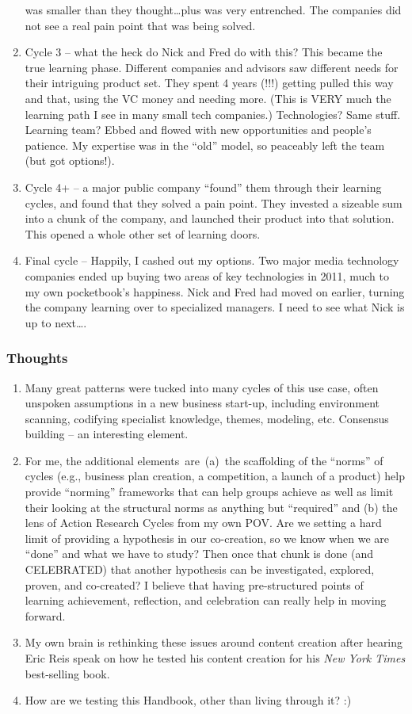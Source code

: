 \begin{enumerate}
  was smaller than they thought\ldots{}plus was very entrenched. The
  companies did not see a real pain point that was being solved.
\item
  Cycle 3 -- what the heck do Nick and Fred do with this? This became
  the true learning phase. Different companies and advisors saw
  different needs for their intriguing product set. They spent 4 years
  (!!!) getting pulled this way and that, using the VC money and needing
  more. (This is VERY much the learning path I see in many small tech
  companies.) Technologies? Same stuff. Learning team? Ebbed and flowed
  with new opportunities and people's patience. My expertise was in the
  ``old'' model, so peaceably left the team (but got options!).
\item
  Cycle 4+ -- a major public company ``found'' them through their
  learning cycles, and found that they solved a pain point. They
  invested a sizeable sum into a chunk of the company, and launched
  their product into that solution. This opened a whole other set of
  learning doors.
\item
  Final cycle -- Happily, I cashed out my options. Two major media
  technology companies ended up buying two areas of key technologies in
  2011, much to my own pocketbook's happiness. Nick and Fred had moved
  on earlier, turning the company learning over to specialized managers.
  I need to see what Nick is up to next\ldots{}.
\end{enumerate}

\subsubsection{Thoughts}

\begin{enumerate}
\item
  Many great patterns were tucked into many cycles of this use case,
  often unspoken assumptions in a new business start-up, including
  environment scanning, codifying specialist knowledge, themes,
  modeling, etc. Consensus building -- an interesting element.
\item
  For me, the additional elements~are~(a)~the scaffolding of the
  ``norms'' of cycles (e.g., business plan creation, a competition, a
  launch of a product) help provide ``norming'' frameworks that can help
  groups achieve as well as limit their looking at the structural norms
  as anything but ``required'' and (b) the lens of Action Research
  Cycles from my own POV. Are we setting a hard limit of providing a
  hypothesis in our co-creation, so we know when we are ``done'' and
  what we have to study? Then once that chunk is done (and CELEBRATED)
  that another hypothesis can be investigated, explored, proven, and
  co-created? I believe that having pre-structured points of learning
  achievement, reflection, and celebration can really help in moving
  forward.
\item
  My own brain is rethinking these issues around content creation after
  hearing Eric Reis speak on how he tested his content creation for his
  \emph{New York Times} best-selling book.
\item
  How are we testing this Handbook, other than living through it? :)
\end{enumerate}
